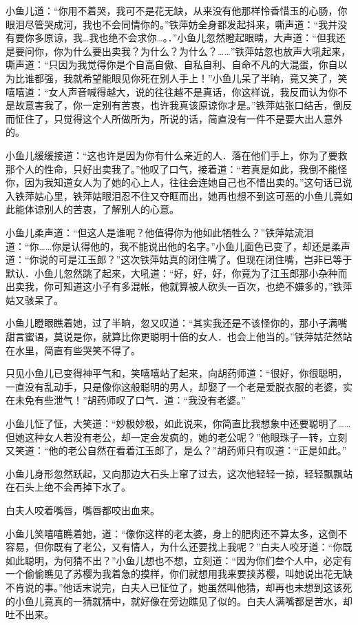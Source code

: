 \documentclass[12pt,oneside]{book}
\begin{document}
小鱼儿道：``你用不着哭，我可不是花无缺，从来没有他那样怜香惜玉的心肠，你眼泪尽管哭成河，我也不会同情你的。''铁萍妨全身都发起抖来，嘶声道：``我并没有要你多原谅，我\ldots 我也绝不会求你\ldots。．''小鱼儿忽然瞪起眼睛，大声道：``但我还是要问你，你为什么要出卖我？为什么？为什么？\ldots\ldots{}''铁萍姑忽也放声大吼起来，嘶声道：``只因为我觉得你是个自高自傲、自私自利、自命不凡的大混蛋，你自以为比谁都强，我就希望能眼见你死在别人手上！''小鱼儿呆了半晌，竟又笑了，笑嘻嘻道：``女人声音喊得越大，说的往往越不是真话，你这样说，我反而认为你不是故意害我了，你一定别有苦衷，也许我真该原谅你才是。''铁萍姑张口结舌，倒反而怔住了，只觉得这个人所做所为，所说的话，简直没有一件不是要大出人意外的。

小鱼儿缓缓接道：``这也许是因为你有什么亲近的人．落在他们手上，你为了要救那个人的性命，只好出卖我了。''他叹了口气，接着道：``若真是如此，我倒不能怪你，因为我知道女人为了她的心上人，往往会连她自己也不惜出卖的。''这句话已说入铁萍姑心里，铁萍姑眼泪忍不住又夺眶而出，她再也想不到这可恶的小鱼儿竟如此能体谅别人的苦衷，了解别人的心意。

小鱼儿柔声道：``但这人是谁呢？他值得你为他如此牺牲么？''铁萍姑流泪道：``你\ldots\ldots 你是认得他的，我不能说出他的名字。''小鱼儿面色已变了，却还是柔声道：``你说的可是江玉郎？''这次铁萍姑真的闭住嘴了。但现在闭住嘴，岂非已等于默认．小鱼儿忽然跳了起来，大吼道：``好，好，好，你竟为了江玉郎那小杂种而出卖我，你可知道这小子有多混帐，他就算被人砍头一百次，也绝不嫌多的，''铁萍姑又骇呆了。

小鱼儿瞪眼瞧着她，过了半晌，忽又叹道：``其实我还是不该怪你的，那小子满嘴甜言蜜语，莫说是你，就算比你更聪明十倍的女人．也会上他当的。''铁萍姑茫然站在水里，简直有些哭笑不得了。

只见小鱼儿已变得神平气和，笑嘻嘻站了起来，向胡药师道：``很好，你很聪明，一直没有乱动手，只是像你这般聪明的男人，却娶了一个老是爱脱衣服的老婆，实在未免有些泄气！''胡药师叹了口气．道：``我没有老婆。''

小鱼儿怔了怔，大笑道：``妙极妙极，如此说来，你简直比我想象中还要聪明了\ldots\ldots 但她这种女人若没有老公，却一定会发疯的，她的老公呢？''他眼珠子一转，立刻又笑道：``他的老公自然在看着江玉郎了，是么？''胡药师只有叹道：``正是如此。''

小鱼儿身形忽然跃起，又向那边大石头上窜了过去，这次他轻轻一掠，轻轻飘飘站在石头上绝不会再掉下水了。

白夫人咬着嘴唇，嘴唇都咬出血来。

小鱼儿笑嘻嘻瞧着她，道：``像你这样的老太婆，身上的肥肉还不算太多，这倒不容易，但你既有了老公，又有情人，为什么还要找上我呢？''白夫人咬牙道：``你既如此聪明，为何猜不出？''小鱼儿想也不想，立刻道：``因为你们叁个人中，必定有一个偷偷瞧见了苏樱为我着急的摸样，你们就想用我来要挟苏樱，叫她说出花无缺不肯说的事。''他话末说完，白夫人已怔位了，她虽然叫他猜，却再也未想到这该死的小鱼儿竟真的一猜就猜中，就好像在旁边瞧见了似的。白夫人满嘴都是苦水，却吐不出来。
\end{document}

